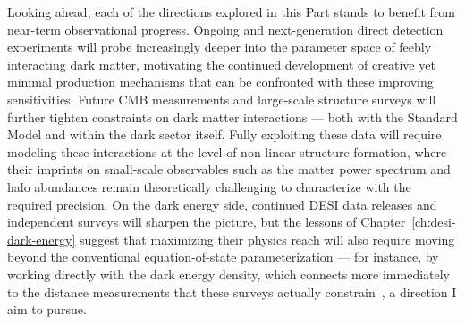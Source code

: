Looking ahead, each of the directions explored in this Part stands to benefit from near-term observational progress. Ongoing and next-generation direct detection experiments will probe increasingly deeper into the parameter space of feebly interacting dark matter, motivating the continued development of creative yet minimal production mechanisms that can be confronted with these improving sensitivities. Future CMB measurements and large-scale structure surveys will further tighten constraints on dark matter interactions --- both with the Standard Model and within the dark sector itself. Fully exploiting these data will require modeling these interactions at the level of non-linear structure formation, where their imprints on small-scale observables such as the matter power spectrum and halo abundances remain theoretically challenging to characterize with the required precision. On the dark energy side, continued DESI data releases and independent surveys will sharpen the picture, but the lessons of Chapter~\ref{ch:desi-dark-energy} suggest that maximizing their physics reach will also require moving beyond the conventional equation-of-state parameterization --- for instance, by working directly with the dark energy density, which connects more immediately to the distance measurements that these surveys actually constrain~\cite{Wang:2025vfb}, a direction I aim to pursue.
